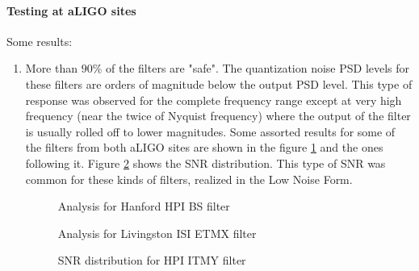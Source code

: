 \documentclass[a4paper,12pt]{article}
\begin{document}
		\paragraph{Testing at aLIGO sites} Some results:
	\begin{enumerate}
		\item More than $90\%$ of the filters are "safe". The quantization noise PSD levels for these filters are orders of magnitude below the output PSD level. This type of response was observed for the complete frequency range except at very high frequency (near the twice of Nyquist frequency) where the output of the filter is usually rolled off to lower magnitudes. Some assorted results for some of the filters from both aLIGO sites are shown in the figure \ref{good} and the ones following it. Figure \ref{good_snr} shows the SNR distribution. This type of SNR was common for these kinds of filters, realized in the Low Noise Form.
		\begin{figure}[H]
 
			  \centering
			  
			  \def\svgscale{0.3}
			  \tiny{
			  
			  }
			  \caption{Analysis for Hanford HPI BS filter}
			 \label{good}
		\end{figure}
% 
%			  
		\begin{figure}[H]
 
			  \centering
			  \def\svgscale{0.3}		 
			  \tiny{ 
			  
			  }
			  \caption{Analysis for Livingston ISI ETMX filter}
		\end{figure}
% 
%			  
		\begin{figure}[H]
 
			  \centering
			  \def\svgscale{0.3}
			  \tiny{
			  
			  }
			  \caption{SNR distribution for HPI ITMY filter}
			 \label{good_snr}
		\end{figure}
		

\end{enumerate}
\end{document}
